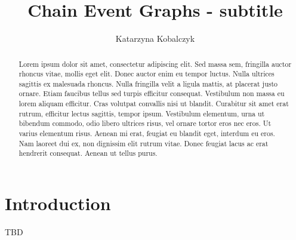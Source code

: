 \documentclass[runningheads]{llncs}
\begin{document}
%
\title{Chain Event Graphs - subtitle}
%
%
\author{Katarzyna Kobalczyk}
%
%

%
\maketitle              %
%
\begin{abstract}
Lorem ipsum dolor sit amet, consectetur adipiscing elit. Sed massa sem, fringilla auctor rhoncus vitae, mollis eget elit. Donec auctor enim eu tempor luctus. Nulla ultrices sagittis ex malesuada rhoncus. Nulla fringilla velit a ligula mattis, at placerat justo ornare. Etiam faucibus tellus sed turpis efficitur consequat. Vestibulum non massa eu lorem aliquam efficitur. Cras volutpat convallis nisi ut blandit. Curabitur sit amet erat rutrum, efficitur lectus sagittis, tempor ipsum. Vestibulum elementum, urna ut bibendum commodo, odio libero ultrices risus, vel ornare tortor eros nec eros. Ut varius elementum risus. Aenean mi erat, feugiat eu blandit eget, interdum eu eros. Nam laoreet dui ex, non dignissim elit rutrum vitae. Donec feugiat lacus ac erat hendrerit consequat. Aenean ut tellus purus.

\end{abstract}
%
%
%
\section{Introduction}
TBD
\end{document}
